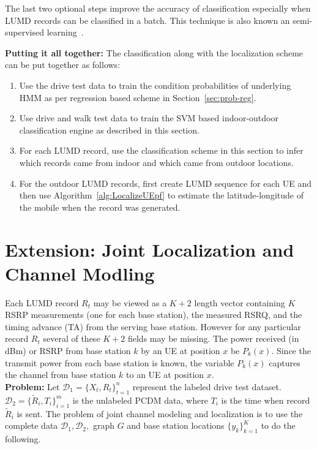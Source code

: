 \documentclass[conference, 10pt]{IEEEtran}
\begin{document}
The last two optional steps improve the accuracy of classification especially when
LUMD records can be classified in a batch. This technique is also known an
semi-supervised learning~\cite{BishopML}.


{\bf Putting it all together:} The classification along with the localization scheme
can be put together as follows:
\begin{enumerate}
	\item Use the drive test data to train the condition probabilities of
		underlying HMM as per regression based scheme in Section~\ref{sec:prob-reg}.

	\item Use drive and walk test data to train the SVM based indoor-outdoor
		classification engine as described in this section.

	\item For each LUMD record, use the classification scheme in this section to
		infer which records came from indoor and which came from outdoor
		locations.

	\item For the outdoor LUMD records, first create LUMD sequence for each UE
		and then use Algorithm~\ref{alg:LocalizeUEpf} to 
		estimate the latitude-longitude of the mobile when the record was generated.
\end{enumerate}

\iffalse

\section{Extension: Joint Localization and Channel Modling}
Each LUMD record $R_t$ may be viewed as a $K+2$ length vector containing $K$
RSRP measurements (one for each base station), the measured RSRQ, and the timing
advance (TA) from the serving base station. However for any particular record
$R_t$ several of these $K+2$ fields may be missing. The power received (in dBm)
or RSRP from base station $k$ by an UE at position $x$ be $P_k(x).$ Since the
transmit power from each base station is known, the variable $P_k(x)$ captures
the channel from base station $k$ to an UE at position $x.$ \\     

\textbf{Problem:} Let $\mathcal{D}_1=\{X_t,R_t\}_{t=1}^n$ represent the labeled
drive test dataset. $\mathcal{D}_2 = \{\tilde{R}_i,T_i\}_{i=1}^m$ is the
unlabeled PCDM data, where $T_i$ is the time when record $\tilde{R}_i$ is sent.
The problem of joint channel modeling and localization is to use the complete
data $\mathcal{D}_1,\mathcal{D}_2,$ graph $G$ and base station locations
$\{y_k\}_{k=1}^K$ to do the following.
\end{document}
